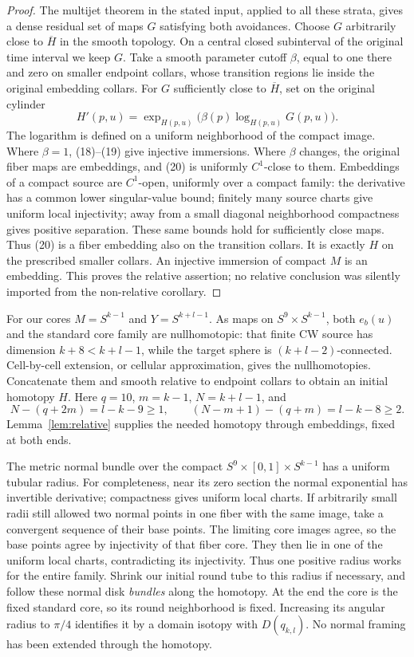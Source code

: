 \documentclass[11pt]{article}
\begin{document}
\begin{proof}
The multijet theorem in the stated input, applied to all these
strata, gives a dense residual set of maps \(G\) satisfying both
avoidances. Choose \(G\) arbitrarily close to \(\overline H\) in
the smooth topology. On a central closed subinterval of the
original time interval we keep \(G\).
Take a smooth parameter cutoff \(\beta\), equal to one there and
zero on smaller endpoint collars, whose transition regions lie
inside the original embedding collars.
For \(G\) sufficiently close to \(\overline H\), set on the original
cylinder
\[
 H'(p,u)=\exp_{H(p,u)}
       \bigl(\beta(p)\log_{H(p,u)}G(p,u)\bigr).
 \tag{20}
\]
The logarithm is defined on a uniform neighborhood of the compact
image. Where \(\beta=1\), (18)--(19) give injective immersions.
Where \(\beta\) changes, the original fiber maps are embeddings,
and (20) is uniformly \(C^1\)-close to them. Embeddings of a compact
source are \(C^1\)-open, uniformly over a compact family:
the derivative has a common lower singular-value bound; finitely
many source charts give uniform local injectivity; away from a
small diagonal neighborhood compactness gives positive separation.
These same bounds hold for sufficiently close maps.
Thus (20) is a fiber embedding also on the transition collars.
It is exactly \(H\) on the prescribed smaller collars.
An injective immersion of compact \(M\) is an embedding.
This proves the relative assertion; no relative conclusion was
silently imported from the non-relative corollary.
\end{proof}

For our cores \(M=S^{k-1}\) and \(Y=S^{k+l-1}\).
As maps on \(S^9\times S^{k-1}\), both \(e_b(u)\) and the standard
core family are nullhomotopic: that finite CW source has dimension
\(k+8<k+l-1\), while the target sphere is
\((k+l-2)\)-connected. Cell-by-cell extension, or cellular
approximation, gives the nullhomotopies.
Concatenate them and smooth relative to endpoint collars to obtain
an initial homotopy \(H\).
Here \(q=10\), \(m=k-1\), \(N=k+l-1\), and
\[
 N-(q+2m)=l-k-9\geq1,\qquad
 (N-m+1)-(q+m)=l-k-8\geq2 .                       \tag{21}
\]
Lemma~\ref{lem:relative} supplies the needed homotopy through
embeddings, fixed at both ends.

The metric normal bundle over the compact
\(S^9\times[0,1]\times S^{k-1}\) has a uniform tubular radius.
For completeness, near its zero section the normal exponential
has invertible derivative; compactness gives uniform local charts.
If arbitrarily small radii still allowed two normal points in one
fiber with the same image, take a convergent sequence of their base
points. The limiting core images agree, so the base points agree
by injectivity of that fiber core. They then lie in one of the
uniform local charts, contradicting its injectivity.
Thus one positive radius works for the entire family.
Shrink our initial round tube to this radius if necessary, and
follow these normal disk \emph{bundles} along the homotopy.
At the end the core is the fixed standard core, so its round
neighborhood is fixed. Increasing its angular radius to \(\pi/4\)
identifies it by a domain isotopy with \(D(q_{k,l})\).
No normal framing has been extended through the homotopy.
\end{document}
